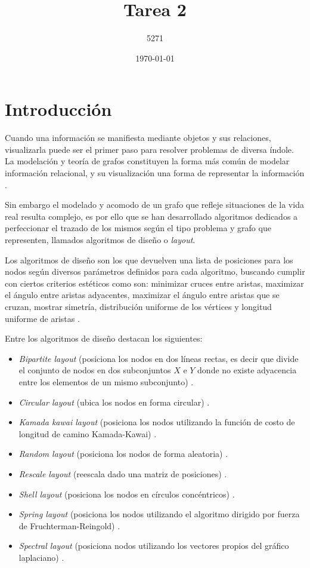 \documentclass{article}
\title{Tarea 2}
\author{5271}
\date{\today}
\begin{document}
\maketitle
\section{Introducción}
Cuando una información se manifiesta mediante objetos y sus relaciones, visualizarla puede ser el primer paso para resolver problemas de diversa índole. 
La modelación y teoría de grafos constituyen la forma más común de modelar información relacional, y su visualización una forma de representar la información \cite {tesis}.\linebreak

Sin embargo el modelado y acomodo de un grafo que refleje situaciones de la vida real resulta complejo, es por ello que se han desarrollado algoritmos dedicados a perfeccionar el trazado de los mismos según el tipo problema y grafo que representen, llamados algoritmos de diseño o \textit{layout}.\linebreak

Los algoritmos de diseño son los que devuelven una lista de posiciones para los nodos según diversos parámetros definidos para cada algoritmo, buscando cumplir con ciertos criterios estéticos como son: minimizar cruces entre aristas, maximizar el ángulo entre aristas adyacentes, maximizar el ángulo entre aristas que se cruzan, mostrar simetría, distribución uniforme de los vértices y longitud uniforme de aristas \cite {tesis}.\linebreak

Entre los algoritmos de diseño destacan los siguientes:

\begin{itemize}
 \item\textit{Bipartite layout} (posiciona los nodos en dos líneas rectas, es decir que divide el conjunto de nodos en dos subconjuntos $ X $ e $ Y $ donde no existe adyacencia entre los elementos de un mismo subconjunto)  \cite{networkx}.  
 \item\textit{Circular layout} (ubica los nodos en forma circular) \cite{networkx}.
	\item\textit{Kamada kawai layout} (posiciona los nodos utilizando la función de costo de longitud de camino Kamada-Kawai) \cite{networkx}.
	\item\textit{Random layout} (posiciona los nodos de forma aleatoria) \cite{networkx}.
	\item\textit{Rescale layout} (reescala dado una matriz de posiciones) \cite{networkx}.
	\item\textit{Shell layout} (posiciona los nodos en círculos concéntricos) \cite{networkx}.
	\item\textit{Spring layout} (posiciona los nodos utilizando el algoritmo dirigido por fuerza de Fruchterman-Reingold) \cite{networkx}.
	\item\textit{Spectral layout} (posiciona nodos utilizando los vectores propios del gráfico laplaciano) \cite{networkx}.
\end{itemize}
\end{document}
